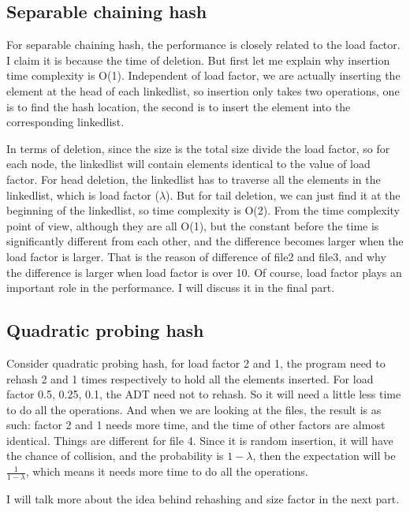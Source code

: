 \documentclass[]{article}
\begin{document}
\subsection{Separable chaining hash}\label{separable-chaining-hash}

For separable chaining hash, the performance is closely related to the
load factor. I claim it is because the time of deletion. But first let
me explain why insertion time complexity is O(1). Independent of load
factor, we are actually inserting the element at the head of each
linkedlist, so insertion only takes two operations, one is to find the hash
location, the second is to insert the element into the corresponding
linkedlist.

In terms of deletion, since the size is the total size divide the load
factor, so for each node, the linkedlist will contain elements identical
to the value of load factor. For head deletion, the linkedlist has to
traverse all the elements in the linkedlist, which is load factor
(\(\lambda\)). But for tail deletion, we can just find it at the
beginning of the linkedlist, so time complexity is O(2). From the time
complexity point of view, although they are all O(1), but the constant
before the time is significantly different from each other, and the
difference becomes larger when the load factor is larger. That is the
reason of difference of file2 and file3, and why the difference is
larger when load factor is over 10. Of course, load factor plays an important
role in the performance. I will discuss it in the final part.

\subsection{Quadratic probing hash}\label{quadratic-probing-hash}

Consider quadratic probing hash, for load factor 2 and 1, the program
need to rehash 2 and 1 times respectively to hold all the elements
inserted. For load factor 0.5, 0.25, 0.1, the ADT need not to rehash. So
it will need a little less time to do all the operations. And when we
are looking at the files, the result is as such: factor 2 and 1 needs
more time, and the time of other factors are almost identical. Things are
different for file 4. Since it is random insertion, it will have the chance
of collision, and the probability is \(1-\lambda\), then the
expectation will be \(\frac{1}{1-\lambda}\), which means it needs more time
to do all the operations.

I will talk more about the idea behind rehashing and size factor in the next part.
\end{document}
